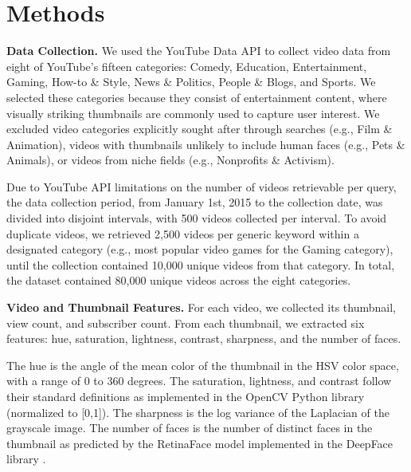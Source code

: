 \documentclass{article}
\begin{document}
\section{Methods}
\textbf{Data Collection.} 
We used the YouTube Data API \cite{youtubeapi} to collect video data from eight of YouTube's fifteen categories: Comedy, Education, Entertainment, Gaming, How-to \& Style, News \& Politics, People \& Blogs, and Sports. We selected these categories because they consist of entertainment content, where visually striking thumbnails are commonly used to capture user interest. We excluded video categories explicitly sought after through searches (e.g., Film \& Animation), videos with thumbnails unlikely to include human faces (e.g., Pets \& Animals), or videos from niche fields (e.g., Nonprofits \& Activism).

Due to YouTube API limitations on the number of videos retrievable per query, the data collection period, from January 1st, 2015 to the collection date, was divided into disjoint intervals, with 500 videos collected per interval. To avoid duplicate videos, we retrieved 2,500 videos per generic keyword within a designated category (e.g., most popular video games for the Gaming category), until the collection contained 10,000 unique videos from that category. In total, the dataset contained 80,000 unique videos across the eight categories.

\textbf{Video and Thumbnail Features.} For each video, we collected its thumbnail, view count, and subscriber count. From each thumbnail, we extracted six features: hue, saturation, lightness, contrast, sharpness, and the number of faces.

The hue is the angle of the mean color of the thumbnail in the HSV color space, with a range of 0 to 360 degrees. The saturation, lightness, and contrast follow their standard definitions as implemented in the OpenCV Python library (normalized to [0,1]). The sharpness is the log variance of the Laplacian of the grayscale image. The number of faces is the number of distinct faces in the thumbnail as predicted by the RetinaFace model implemented in the DeepFace library \cite{serengil2024lightface,serengil2020lightface}.
\end{document}
